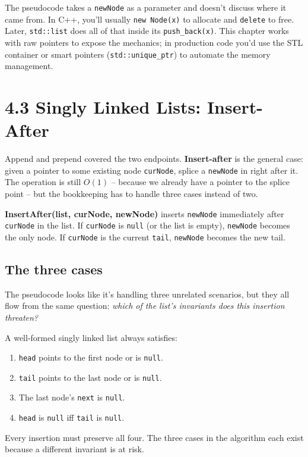 \documentclass[11pt]{article}
\begin{document}
\begin{notebox}
The pseudocode takes a \texttt{newNode} as a parameter and doesn't
discuss where it came from. In C++, you'll usually \texttt{new Node(x)}
to allocate and \texttt{delete} to free. Later, \texttt{std::list}
does all of that inside its \texttt{push\_back(x)}. This chapter
works with raw pointers to expose the mechanics; in production code
you'd use the STL container or smart pointers (\texttt{std::unique\_ptr})
to automate the memory management.
\end{notebox}

\section{4.3 Singly Linked Lists: Insert-After}

Append and prepend covered the two endpoints. \textbf{Insert-after}
is the general case: given a pointer to some existing node
\texttt{curNode}, splice a \texttt{newNode} in right after it. The
operation is still $O(1)$ -- because we already have a pointer to
the splice point -- but the bookkeeping has to handle three cases
instead of two.

\begin{defnbox}
\textbf{InsertAfter(list, curNode, newNode)} inserts \texttt{newNode}
immediately after \texttt{curNode} in the list. If \texttt{curNode}
is \texttt{null} (or the list is empty), \texttt{newNode} becomes
the only node. If \texttt{curNode} is the current \texttt{tail},
\texttt{newNode} becomes the new tail.
\end{defnbox}

\subsection{The three cases}

The pseudocode looks like it's handling three unrelated scenarios,
but they all flow from the same question: \emph{which of the list's
invariants does this insertion threaten?}

\begin{ideabox}
A well-formed singly linked list always satisfies:
\begin{enumerate}[leftmargin=*]
  \item \texttt{head} points to the first node or is \texttt{null}.
  \item \texttt{tail} points to the last node or is \texttt{null}.
  \item The last node's \texttt{next} is \texttt{null}.
  \item \texttt{head} is \texttt{null} iff \texttt{tail} is \texttt{null}.
\end{enumerate}
Every insertion must preserve all four. The three cases in the
algorithm each exist because a different invariant is at risk.
\end{ideabox}
\end{document}

